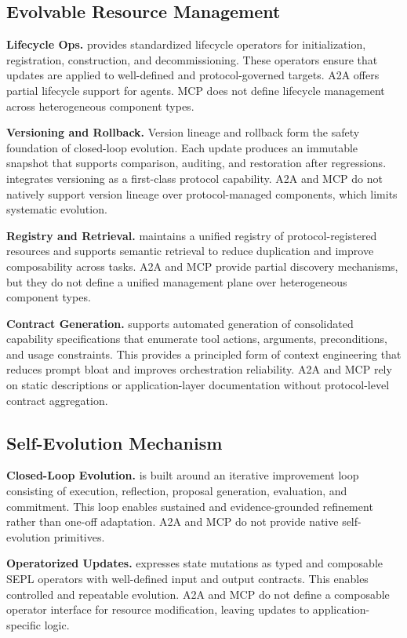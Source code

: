 \subsection{Evolvable Resource Management}

\textbf{Lifecycle Ops.} \projectname provides standardized lifecycle operators for initialization, registration, construction, and decommissioning. These operators ensure that updates are applied to well-defined and protocol-governed targets. A2A offers partial lifecycle support for agents. MCP does not define lifecycle management across heterogeneous component types.

\textbf{Versioning and Rollback.} Version lineage and rollback form the safety foundation of closed-loop evolution. Each update produces an immutable snapshot that supports comparison, auditing, and restoration after regressions. \projectname integrates versioning as a first-class protocol capability. A2A and MCP do not natively support version lineage over protocol-managed components, which limits systematic evolution.

\textbf{Registry and Retrieval.} \projectname maintains a unified registry of protocol-registered resources and supports semantic retrieval to reduce duplication and improve composability across tasks. A2A and MCP provide partial discovery mechanisms, but they do not define a unified management plane over heterogeneous component types.

\textbf{Contract Generation.} \projectname supports automated generation of consolidated capability specifications that enumerate tool actions, arguments, preconditions, and usage constraints. This provides a principled form of context engineering that reduces prompt bloat and improves orchestration reliability. A2A and MCP rely on static descriptions or application-layer documentation without protocol-level contract aggregation.

\subsection{Self-Evolution Mechanism}

\textbf{Closed-Loop Evolution.} \projectname is built around an iterative improvement loop consisting of execution, reflection, proposal generation, evaluation, and commitment. This loop enables sustained and evidence-grounded refinement rather than one-off adaptation. A2A and MCP do not provide native self-evolution primitives.

\textbf{Operatorized Updates.} \projectname expresses state mutations as typed and composable SEPL operators with well-defined input and output contracts. This enables controlled and repeatable evolution. A2A and MCP do not define a composable operator interface for resource modification, leaving updates to application-specific logic.

